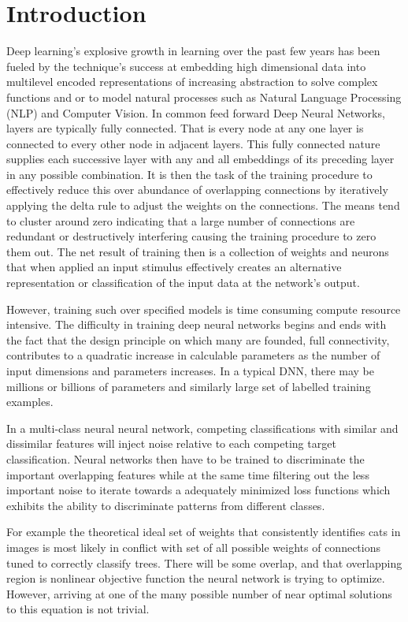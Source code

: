 \documentclass{llncs}
\begin{document}
\section{Introduction}

Deep learning’s explosive growth in learning over the past few years has been fueled by the technique’s success at embedding high dimensional data into multilevel encoded representations of increasing abstraction to solve complex functions and or to model natural processes such as Natural Language Processing (NLP) and Computer Vision. In common feed forward Deep Neural Networks, layers are typically fully connected.  That is every node at any one layer is connected to every other node in adjacent layers.  This fully connected nature supplies each successive layer with any and all embeddings of its preceding layer in any possible combination. It is then the task of the training procedure to effectively reduce this over abundance of overlapping connections by iteratively applying the delta rule to adjust the weights on the connections.  The means tend to cluster around zero indicating that a large number of connections are redundant or destructively interfering causing the training procedure to zero them out.  The net result of training then is a collection of weights and neurons that when applied an input stimulus effectively creates an alternative representation or classification of the input data at the network's output.

However, training such over specified models is time consuming compute resource intensive.  The difficulty in training deep neural networks begins and ends with the fact that the design principle on which many are founded, full connectivity, contributes to a quadratic increase in calculable parameters as the number of input dimensions and parameters increases.  In a typical DNN, there may be millions or billions of parameters and similarly large set of labelled training examples.

In a multi-class neural neural network, competing classifications with similar and dissimilar features will inject noise relative to each competing target classification. Neural networks then have to be trained to discriminate the important overlapping features while at the same time filtering out the less important noise to iterate towards a adequately minimized loss functions which exhibits the ability to discriminate patterns from different classes.

For example the theoretical ideal set of weights that consistently identifies cats in images is most likely in conflict with set of all possible weights of connections tuned to correctly classify trees.  There will be some overlap, and that overlapping region is nonlinear objective function the neural network is trying to optimize.  However, arriving at one of the many possible number of near optimal solutions to this equation is not trivial.
\end{document}
